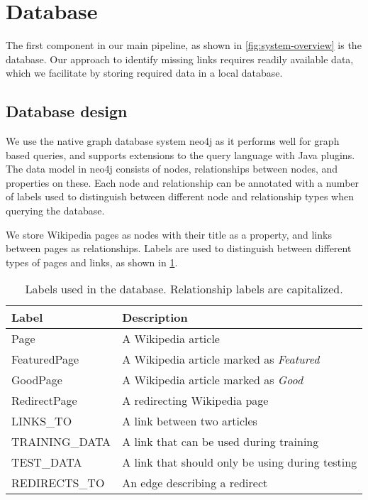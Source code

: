 \section{Database} \label{sec:db}
The first component in our main pipeline, as shown in \cref{fig:system-overview} is the database. Our approach to identify missing links requires readily available data, which we facilitate by storing required data in a local database.

\subsection{Database design} \label{sec:db_design}
We use the native graph database system neo4j as it performs well for graph based queries, and supports extensions to the query language with Java plugins. The data model in neo4j consists of nodes, relationships between nodes, and properties on these. Each node and relationship can be annotated with a number of labels used to distinguish between different node and relationship types when querying the database.

We store Wikipedia pages as nodes with their title as a property, and links between pages as relationships. Labels are used to distinguish between different types of pages and links, as shown in \cref{tab:db_labels}.

\begin{table}[tbp]
\centering
\begin{tabular}{@{}ll@{}}
\toprule
\textbf{Label}         & \textbf{Description}                            \\ \midrule
Page                   & A Wikipedia article                             \\
FeaturedPage           & A Wikipedia article marked as \emph{Featured}   \\
GoodPage               & A Wikipedia article marked as \emph{Good}       \\
RedirectPage           & A redirecting Wikipedia page                    \\ \midrule
LINKS\_TO              & A link between two articles                     \\
TRAINING\_DATA         & A link that can be used during training         \\
TEST\_DATA             & A link that should only be using during testing \\
REDIRECTS\_TO          & An edge describing a redirect                   \\ \bottomrule
\end{tabular}
\caption[Labels used in the database]{Labels used in the database. Relationship labels are capitalized.}
\label{tab:db_labels}
\end{table}


